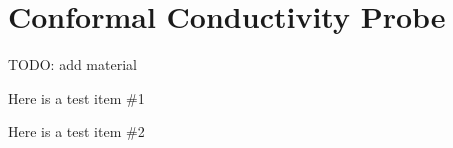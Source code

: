\documentclass[a4paper]{article}
\begin{document}
\section{Conformal Conductivity Probe}
    TODO: add material
    \begin{list}{ahhh}
        \item Here is a test item \#1
        \item Here is a test item \#2
    \end{list}

%
%

\end{document}
